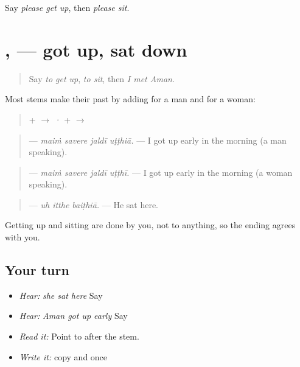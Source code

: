 \begin{tcolorbox}[breakable,colback=teal!4,colframe=teal!35!black,title={Before you move on}]
Say \emph{please get up}, then \emph{please sit}.
\end{tcolorbox}
\section[\texorpdfstring{\pa{ਉੱਠਿਆ} · \pa{ਬੈਠਿਆ} (uṭṭhiā · baiṭhiā)}{ਉੱਠਿਆ · ਬੈਠਿਆ (uṭṭhiā · baiṭhiā)}]{,  — got up, sat down}

\label{lesson:PA-C218-uthia}



\begin{quote}
Say \emph{to get up}, \emph{to sit}, then \emph{I met Aman}.
\end{quote}

\begin{grammarlens}[title={Grammar Lens: stem + \pa{ਿਆ}, stem + \pa{ੀ}}]
Most stems make their past by adding \textbf{} for a man and \textbf{} for a woman:

\begin{quote}
\textbf{} + \textbf{} $\to$ \textbf{} · \textbf{} + \textbf{} $\to$ \textbf{}
\end{quote}

\begin{quote}
\textbf{   } — \emph{maiṁ savere jaldī uṭṭhiā.} — I got up early in the morning (a man speaking).
\end{quote}

\begin{quote}
\textbf{   } — \emph{maiṁ savere jaldī uṭṭhī.} — I got up early in the morning (a woman speaking).
\end{quote}

\begin{quote}
\textbf{  } — \emph{uh itthe baiṭhiā.} — He sat here.
\end{quote}

Getting up and sitting are done by you, not to anything, so the ending agrees with you.
\end{grammarlens}

\subsection*{Your turn}
\begin{itemize}
\raggedright
  \item \emph{Hear:} \emph{she sat here} Say \textbf{  }
  \item \emph{Hear:} \emph{Aman got up early} Say \textbf{  }
  \item \emph{Read it:} \textbf{} Point to \textbf{} after the stem.
  \item \emph{Write it:} copy \textbf{} and \textbf{} once
\end{itemize}

